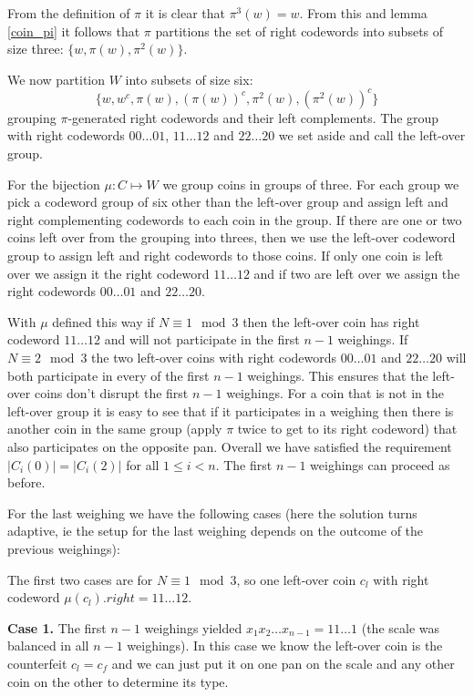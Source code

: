 From the definition of $\pi$ it is clear that $\pi^3(w) = w$. From this and lemma \ref{coin_pi} it follows that $\pi$ partitions the set of right codewords into subsets of size three: $\{w, \pi(w), \pi^2(w)\}$.

We now partition $W$ into subsets of size six: 
$$
\{w, w^c, \pi(w), (\pi(w))^c, \pi^2(w), (\pi^2(w))^c\}
$$
grouping $\pi$-generated right codewords and their left complements. The group with right codewords $00\ldots01$, $11\ldots12$ and $22\ldots20$ we set aside and call the left-over group. 

For the bijection $\mu: C \mapsto W$ we group coins in groups of three. For each group we pick a codeword group of six other than the left-over group and assign left and right complementing codewords to each coin in the group. If there are one or two coins left over from the grouping into threes, then we use the left-over codeword group to assign left and right codewords to those coins. If only one coin is left over we assign it the right codeword $11\ldots12$ and if two are left over we assign the right codewords $00\ldots01$ and $22\ldots20$.

With $\mu$ defined this way if $N \equiv 1 \mod 3$ then the left-over coin has right codeword $11\ldots12$ and will not participate in the first $n-1$ weighings. If $N \equiv 2 \mod 3$ the two left-over coins with right codewords $00\ldots01$ and $22\ldots20$ will both participate in every of the first $n-1$ weighings. This ensures that the left-over coins don't disrupt the first $n-1$ weighings. For a coin that is not in the left-over group it is easy to see that if it participates in a weighing then there is another coin in the same group (apply $\pi$ twice to get to its right codeword) that also participates on the opposite pan. Overall we have satisfied the requirement $|C_i(0)| = |C_i(2)|$ for all $1 \leq i < n$. The first $n-1$ weighings can proceed as before.

For the last weighing we have the following cases (here the solution turns adaptive, ie the setup for the last weighing depends on the outcome of the previous weighings):

The first two cases are for $N \equiv 1 \mod 3$, so one left-over coin $c_l$ with right codeword $\mu(c_l).right=11\ldots12$. 

\textbf{Case 1.} The first $n-1$ weighings yielded $x_1 x_2 \ldots x_{n-1} = 11\ldots1$ (the scale was balanced in all $n-1$ weighings). In this case we know the left-over coin is the counterfeit $c_l=c_f$ and we can just put it on one pan on the scale and any other coin on the other to determine its type.


